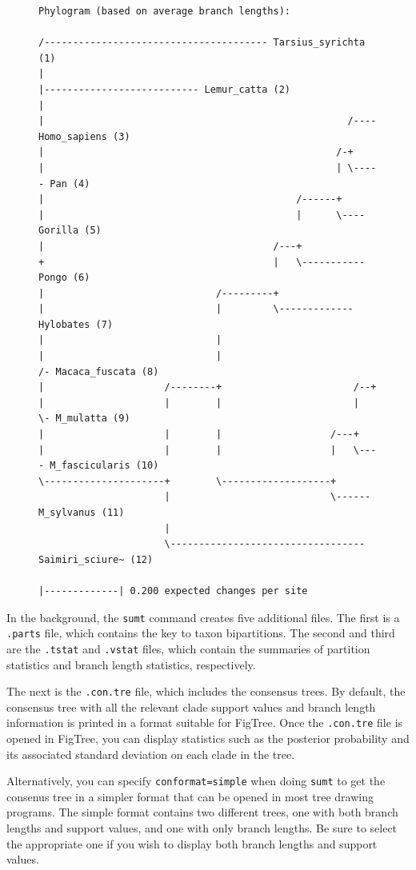 \documentclass[12pt]{book}
\begin{document}
\begin{figure}[H]
\centering
\begin{BVerbatim}[fontsize=\scriptsize]
Phylogram (based on average branch lengths):

/--------------------------------------- Tarsius_syrichta (1)
|
|--------------------------- Lemur_catta (2)
|
|                                                     /---- Homo_sapiens (3)
|                                                   /-+
|                                                   | \----- Pan (4)
|                                            /------+
|                                            |      \---- Gorilla (5)
|                                        /---+
+                                        |   \----------- Pongo (6)
|                              /---------+
|                              |         \------------- Hylobates (7)
|                              |
|                              |                          /- Macaca_fuscata (8)
|                     /--------+                       /--+
|                     |        |                       |  \- M_mulatta (9)
|                     |        |                   /---+
|                     |        |                   |   \---- M_fascicularis (10)
\---------------------+        \-------------------+
                      |                            \------ M_sylvanus (11)
                      |
                      \---------------------------------- Saimiri_sciure~ (12)

|-------------| 0.200 expected changes per site
\end{BVerbatim}
\end{figure}

In the background, the \texttt{sumt} command creates five additional files. The first is a
\texttt{.parts} file, which contains the key to taxon bipartitions. The second and third are the
\texttt{.tstat} and \texttt{.vstat} files, which contain the summaries of partition statistics and
branch length statistics, respectively.

The next is the \texttt{.con.tre} file, which includes the consensus trees. By default, the
consensus tree with all the relevant clade support values and branch length information is printed
in a format suitable for FigTree. Once the \texttt{.con.tre} file is opened in FigTree, you can
display statistics such as the posterior probability and its associated standard deviation on each
clade in the tree.

Alternatively, you can specify \texttt{conformat=simple} when doing \texttt{sumt} to get the
consenus tree in a simpler format that can be opened in most tree drawing programs. The simple
format contains two different trees, one with both branch lengths and support values, and one with
only branch lengths. Be sure to select the appropriate one if you wish to display both branch
lengths and support values.
\end{document}
